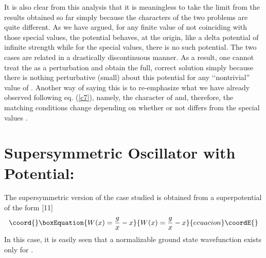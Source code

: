\documentclass[a4paper,11pt]{article}
\begin{document}
It is also clear from this analysis that it is meaningless to take the
\coordHE{} limit from the results obtained so far simply
because  the characters
of the two problems are quite different. As we have argued, for any
finite value of \coordHE{} not coinciding with those special values, the
potential behaves, at the origin, like a delta potential of infinite
strength while for the special values, there is no such potential. The
two cases are related in a drastically discontinuous manner. As a
result, one cannot treat the \coordHE{} as a perturbation
and obtain the full, correct solution simply because there is nothing
perturbative (small) about this potential for any \lq\lq nontrivial''
value of \coordHE{}. Another way of saying this is to re-emphasize what we
have already observed following eq. (\ref{c7}), namely, the character
of \myHighlight{$\kappa$}\coordHE{} and, therefore, the matching conditions change depending
on whether or not \coordHE{} differs from the special values \coordHE{}.

\section{Supersymmetric Oscillator with \coordHE{} Potential:}
The supersymmetric version of the
case studied is obtained from a superpotential of
the form [11]
\begin{equation}\coord{}\boxEquation{
W(x) = {g\over x} - x\label{d1}
}{
W(x) = {g\over x} - x}{ecuacion}\coordE{}\end{equation}
In this case, it is easily seen that a normalizable ground state
wavefunction exists only for \coordHE{}.
\end{document}
